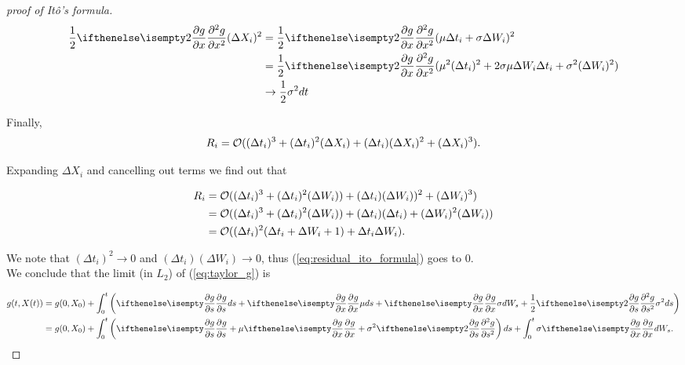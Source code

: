 \documentclass[../TGMAFFIRO.tex]{subfiles}
\begin{document}
\begin{proof}[proof of It\^o's formula]
\begin{align}
\frac{1}{2}\partialwrt[2]{g}{x} (\Delta X_i)^2 &= \frac{1}{2}\partialwrt[2]{g}{x} (\mu\Delta t_i + \sigma \Delta W_i)^2 \nonumber\\
&= \frac{1}{2}\partialwrt[2]{g}{x} (\mu^2 (\Delta t_i)^2 + 2\sigma\mu \Delta W_i \Delta t_i + \sigma^2 (\Delta W_i)^2) \nonumber\\
&\to \frac{1}{2} \sigma^2 dt
\end{align}

Finally, 
\begin{equation}
  R_i = \mathcal{O}((\Delta t_i)^3 + (\Delta t_i)^2(\Delta X_i) + (\Delta t_i)(\Delta X_i)^2 + (\Delta X_i)^3).
\end{equation}

Expanding $\Delta X_i$ and cancelling out terms we find out that

\begin{align}
  R_i &= \mathcal{O}((\Delta t_i)^3 + (\Delta t_i)^2(\Delta W_i)) + (\Delta t_i)(\Delta W_i))^2 + (\Delta W_i)^3) \nonumber \\
  	&= \mathcal{O}((\Delta t_i)^3 + (\Delta t_i)^2(\Delta W_i)) + (\Delta t_i)(\Delta t_i) + (\Delta W_i)^2(\Delta W_i))\nonumber \\
  	&= \mathcal{O}((\Delta t_i)^2(\Delta t_i + \Delta W_i + 1) + \Delta t_i \Delta W_i) \label{eq:residual_ito_formula}.
\end{align}

We note that $(\Delta t_i)^2 \to 0$ and $(\Delta t_i)(\Delta W_i) \to 0$, thus (\ref{eq:residual_ito_formula}) goes to 0.\\

We conclude that the limit (in $L_2$) of (\ref{eq:taylor_g}) is

\begin{align}
	g(t, X(t)) &= g(0, X_0) + \int_0^t\left( \partialwrt{g}{s}ds + \partialwrt{g}{x}{\mu ds} + \partialwrt{g}{x}{\sigma dW_s} + \frac{1}{2}\partialwrt[2]{g}{s}{\sigma^2 ds} \right)\\
			 &= g(0, X_0) + \int_0^t\left(\partialwrt{g}{s} + \mu \partialwrt{g}{x} +\sigma^2 \partialwrt[2]{g}{s} \right)ds + \int_0^t\sigma \partialwrt{g}{x}{dW_s}.
\end{align}
\end{proof}
\end{document}
